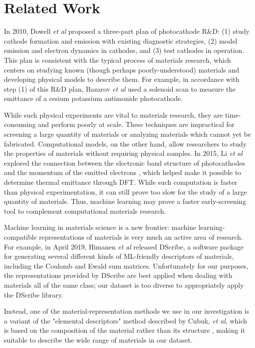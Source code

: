 \documentclass[10pt,twocolumn,letterpaper]{article}
\begin{document}

\section{Related Work}

In 2010, Dowell \textit{et al} proposed a three-part plan of photocathode R\&D: (1) study cathode formation and emission with existing diagnostic strategies, (2) model emission and electron dynamics in cathodes, and (3) test cathodes in operation. \cite{Dowell} 
This plan is consistent with the typical process of  materials research, which centers on studying known (though perhaps poorly-understood) materials and developing physical models to describe them. For example, in accordance with step (1) of this R\&D plan, Bazarov \textit{et al} used a solenoid scan to measure the emittance of a cesium potassium antimonide photocathode. \cite{Bazarov}

While such physical experiments are vital to materials research, they are time-consuming and perform poorly at scale. These techniques are impractical for screening a large quantity of materials or analyzing materials which cannot yet be fabricated. Computational models, on the other hand, allow researchers to study the properties of materials without requiring physical samples. In 2015, Li \textit{et al} explored the connection between the electronic band structure of photocathodes and the momentum of the emitted electrons \cite{Li}, which helped make it possible to determine thermal emittance through DFT. While such computation is faster than physical experimentation, it can still prove too slow for the study of a large quantity of materials. Thus, machine learning may prove a faster early-screening tool to complement computational materials research.

Machine learning in materials science is a new frontier: machine learning-compatible representations of materials is very much an active area of research. For example, in April 2019, Himanen \textit{et al} released DScribe, a software package for generating several different kinds of ML-friendly descriptors of materials, including the Coulomb and Ewald sum matrices. \cite{DScribe} Unfortunately for our purposes, the representations provided by DScribe are best applied when dealing with materials all of the same class; our dataset is too diverse to appropriately apply the DScribe library.

Instead, one of the material-representation methods we use in our investigation is a variant of the "elemental descriptors" method described by Cubuk, \textit{et al}, which is based on the composition of the material rather than its structure \cite{Cubuk}, making it suitable to describe the wide range of materials in our dataset. 
\end{document}
